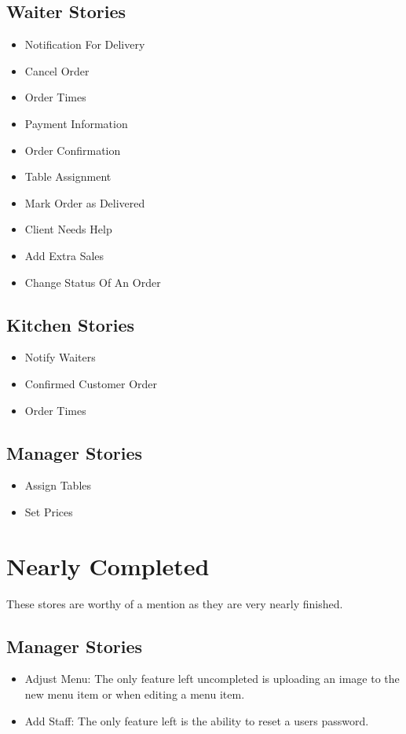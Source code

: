 \documentclass[12pt, twoside, a4paper]{report}
\begin{document}
\subsection*{Waiter Stories}
\begin{itemize}
  \item Notification For Delivery
  \item Cancel Order
  \item Order Times
  \item Payment Information
  \item Order Confirmation
  \item Table Assignment
  \item Mark Order as Delivered
  \item Client Needs Help
  \item Add Extra Sales
  \item Change Status Of An Order
\end{itemize}

\subsection*{Kitchen Stories}
\begin{itemize}
  \item Notify Waiters
  \item Confirmed Customer Order
  \item Order Times
\end{itemize}

\subsection*{Manager Stories}
\begin{itemize}
  \item Assign Tables
  \item Set Prices
\end{itemize}

\section*{Nearly Completed}
These stores are worthy of a mention as they are very nearly finished.

\subsection*{Manager Stories}
\begin{itemize}
  \item Adjust Menu:
    The only feature left uncompleted is uploading an image to the new menu item or when editing a menu item.
  \item Add Staff:
    The only feature left is the ability to reset a users password.
\end{itemize}
\end{document}
